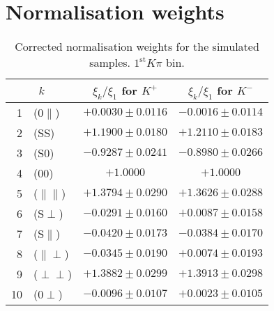 \section{Normalisation weights}\label{app:BsJpsiKst_angana_final}
\begin{table}[hbtp]
\center\footnotesize
  \caption{\small Corrected normalisation weights for the simulated samples. $1^{\text{st}}K\pi$ bin.}
  \center
  \begin{tabular}{r l c c}
    
    \multicolumn{2}{c}{$k$}       &  $\xi_k/\xi_1$ for $K^+$    &  $\xi_k/\xi_1$ for $K^-$        \\
    \hline
     1  &  ($0\parallel$)         & $ +0.0030 \pm 0.0116 $ & $ -0.0016 \pm 0.0114 $        \\
     2  &  (SS)                   & $ +1.1900 \pm 0.0180 $ & $ +1.2110 \pm 0.0183 $        \\
     3  &  (S0)                   & $ -0.9287 \pm 0.0241 $ & $ -0.8980 \pm 0.0266 $        \\
     4  &  (00)                   & $ +1.0000            $ & $ +1.0000            $        \\
     5  &  ($\parallel\parallel$) & $ +1.3794 \pm 0.0290 $ & $ +1.3626 \pm 0.0288 $        \\
     6  &  (S$\perp$)             & $ -0.0291 \pm 0.0160 $ & $ +0.0087 \pm 0.0158 $        \\
     7  &  (S$\parallel$)         & $ -0.0420 \pm 0.0173 $ & $ -0.0384 \pm 0.0170 $        \\
     8  &  ($\parallel\perp$)     & $ -0.0345 \pm 0.0190 $ & $ +0.0074 \pm 0.0193 $        \\
     9  &  ($\perp\perp$)         & $ +1.3882 \pm 0.0299 $ & $ +1.3913 \pm 0.0298 $        \\
    10  &  ($0\perp$)             & $ -0.0096 \pm 0.0107 $ & $ +0.0023 \pm 0.0105 $        \\
    \hline                                                   
  \end{tabular}
\end{table}


